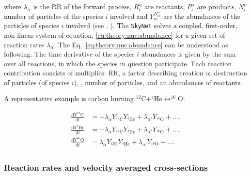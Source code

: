 where $\lambda_{\alpha}$ is the \ac{RR} of the forward process, $R_{i}^{\alpha}$ are reactants, $P_{i}^{\alpha}$ are products, $N_{i}^{\alpha}$ number of particles of the species $i$ involved and $Y_m^{N_{m}^{\alpha}}$ are the abundances of the particles of species $i$ involved (see \eg, \citet{Hix:1999}).
The \texttt{SkyNet} solves a coupled, first-order, non-linear system of equation, \eqref{eq:theory:nuc:abundance} for a given set of reaction rates $\lambda_{\alpha}$.
The Eq.~\eqref{eq:theory:nuc:abundance} can be understood as following. The time derivative of the species $i$ abundances is given by the sum over all reactions, in which the species in question participate. Each reaction contribution consists of multiplies: \ac{RR}, a factor describing creation or destruction of particles (of species $i$), \ie, number of particles, and an abundances of reactants. 

A representative example is carbon burning $^{12}\text{C} + ^{4}\text{He} \leftrightarrow ^{16}\text{O}$:

\begin{eqnarray*}
    \frac{\text{d}Y^{12}\text{C}}{\text{d}t} &= -\lambda_{\alpha}Y_{^{12}\text{C}} Y_{^{4}\text{He}} + \lambda_{\alpha'}Y_{^{16}\text{O}} + \dots , \\
    \frac{\text{d}Y^{4}\text{He}}{\text{d}t} &= -\lambda_{\alpha}Y_{^{12}\text{C}} Y_{^{4}\text{He}} + \lambda_{\alpha'}Y_{^{16}\text{O}} + \dots , \\
    \frac{\text{d}Y^{16}\text{O}}{\text{d}t} &= \lambda_{\alpha}Y_{^{12}\text{C}} Y_{^{4}\text{He}} + \lambda_{\alpha'}Y_{^{16}\text{O}} + \dots . \\
\end{eqnarray*}


\subsubsection{Reaction rates and velocity averaged cross-sections}



